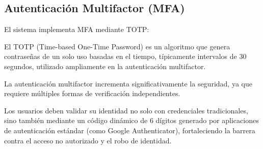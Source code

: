 \subsection{Autenticación Multifactor (MFA)}

El sistema implementa MFA mediante TOTP:

El TOTP (Time-based One-Time Password) es un algoritmo que genera contraseñas de un solo uso basadas en el tiempo, típicamente intervalos de 30 segundos, utilizado ampliamente en la autenticación multifactor.

La autenticación multifactor incrementa significativamente la seguridad, ya que requiere múltiples formas de verificación independientes.

Los usuarios deben validar su identidad no solo con credenciales tradicionales, sino también mediante un código dinámico de 6 dígitos generado por aplicaciones de autenticación estándar (como Google Authenticator), fortaleciendo la barrera contra el acceso no autorizado y el robo de identidad.

\clearpage
